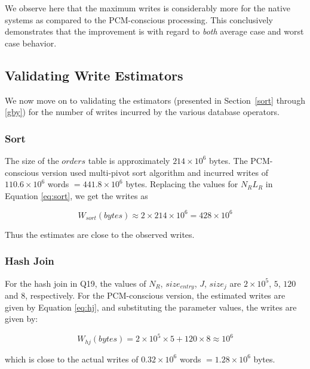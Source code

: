 We observe here that the maximum writes is considerably more for the
native systems as compared to the PCM-conscious processing. This
conclusively demonstrates that the improvement is with regard to
\emph{both} average case and worst case behavior.

\subsection{Validating Write Estimators}
\label{validation}

We now move on to validating the estimators
(presented in Section~\ref{sort} through \ref{gby})  for the number of
writes incurred by the various database operators.

\subsubsection{Sort}
The size of the $orders$ table is approximately $214 \times 10^6$ bytes. 
The PCM-conscious version used multi-pivot sort algorithm and
incurred writes of $110.6 \times 10^6$ words $= 441.8 \times 10^6 $
bytes. Replacing the values for $N_R L_R$ in Equation \ref{eq:sort},
we get the writes as 
\begin{small}
$$W_{sort}(bytes) \approx 2 \times 214 \times
10^6  = 428 \times 10^6 $$ 
\end{small}
Thus the estimates are close to the
observed writes.



\subsubsection{Hash Join}
For the hash join in Q19, the values of $N_R$, $size_{entry}$, $J$,
$size_{j}$ are $2 \times 10^5$, $5$, $120$ and $8$, respectively. 
For the PCM-conscious version, the estimated writes are given by Equation \ref{eq:hj},
and substituting  the  parameter values, the writes are given by:  
\begin{small}
$$W_{hj}(bytes) = 2 \times 10^5 \times 5 + 120 \times 8 \approx 10^6$$
\end{small}
which is close to the actual writes of $0.32 \times 10^6$ words $=
1.28 \times 10^6$ bytes.

